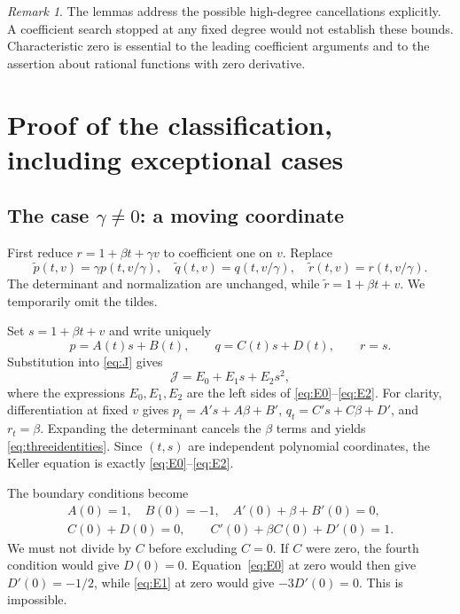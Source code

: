 \documentclass[11pt,a4paper]{article}
\numberwithin{equation}{section}
\theoremstyle{definition}
\theoremstyle{remark}
\newtheorem{remark}[theorem]{Remark}
\newcommand{\J}{\mathcal{J}}
\begin{document}
\begin{remark}
The lemmas address the possible high-degree cancellations explicitly. A
coefficient search stopped at any fixed degree would not establish these
bounds. Characteristic zero is essential to the leading coefficient
arguments and to the assertion about rational functions with zero derivative.
\end{remark}

\section{Proof of the classification, including exceptional cases}
\label{sec:proof}

\subsection{\texorpdfstring{The case $\gamma\ne0$: a moving coordinate}{The case gamma nonzero: a moving coordinate}}

First reduce $r=1+\beta t+\gamma v$ to coefficient one on $v$. Replace
\begin{equation}\label{eq:gammachange}
\widetilde p(t,v)=\gamma p(t,v/\gamma),\quad
\widetilde q(t,v)=q(t,v/\gamma),\quad
\widetilde r(t,v)=r(t,v/\gamma).
\end{equation}
The determinant and normalization are unchanged, while
$\widetilde r=1+\beta t+v$. We temporarily omit the tildes.

Set $s=1+\beta t+v$ and write uniquely
\begin{equation}\label{eq:ABCD}
p=A(t)s+B(t),\qquad q=C(t)s+D(t),\qquad r=s.
\end{equation}
Substitution into \eqref{eq:J} gives
\begin{equation}\label{eq:threeidentities}
\J=E_0+E_1s+E_2s^2,
\end{equation}
where the expressions $E_0,E_1,E_2$ are the left sides of
\eqref{eq:E0}--\eqref{eq:E2}. For clarity, differentiation at fixed $v$
gives $p_t=A's+A\beta+B'$, $q_t=C's+C\beta+D'$, and $r_t=\beta$.
Expanding the determinant cancels the $\beta$ terms and yields
\eqref{eq:threeidentities}. Since $(t,s)$ are independent polynomial
coordinates, the Keller equation is exactly
\eqref{eq:E0}--\eqref{eq:E2}.

The boundary conditions become
\begin{equation}\label{eq:boundaryABCD}
\begin{gathered}
A(0)=1,\quad B(0)=-1,\quad A'(0)+\beta+B'(0)=0,\\
C(0)+D(0)=0,\qquad C'(0)+\beta C(0)+D'(0)=1.
\end{gathered}
\end{equation}
We must not divide by $C$ before excluding $C=0$. If $C$ were zero, the
fourth condition would give $D(0)=0$. Equation~\eqref{eq:E0} at zero would
then give $D'(0)=-1/2$, while \eqref{eq:E1} at zero would give
$-3D'(0)=0$. This is impossible.
\end{document}
